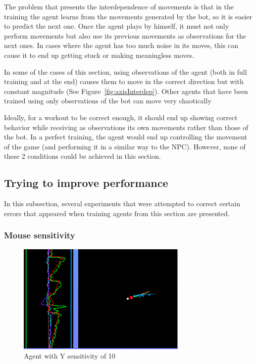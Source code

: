 The problem that presents the interdependence of movements is that in the training the agent learns from the movements generated by the bot, so it is easier to predict the next one. Once the agent plays by himself, it must not only perform movements but also use its previous movements as observations for the next ones. In cases where the agent has too much noise in its moves, this can cause it to end up getting stuck or making meaningless moves.

In some of the cases of this section, using observations of the agent (both in full training and at the end) causes them to move in the correct direction but with constant magnitude (See Figure~\ref{fig:axisInterdep}). Other agents that have been trained using only observations of the bot can move very chaotically

Ideally, for a workout to be correct enough, it should end up showing correct behavior while receiving as observations its own movements rather than those of the bot. In a perfect training, the agent would end up controlling the movement of the game (and performing it in a similar way to the NPC). However, none of these 2 conditions could be achieved in this section.

\subsection{Trying to improve performance}
\label{sec:improving} %

In this subsection, several experiments that were attempted to correct certain errors that appeared when training agents from this section are presented.

\subsubsection{Mouse sensitivity}

\begin{figure}[h]
  \centering
		\includegraphics[width=.6\textwidth]{img/axisYsens.png}
  \caption{Agent with Y sensitivity of 10}
  \label{fig:axisYsens}
\end{figure}

